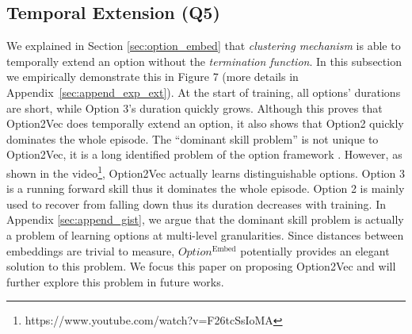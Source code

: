 \documentclass{article}
\newcommand{\linkblue}[1]{\textcolor[HTML]{2E649E}{#1}}
\begin{document}
\vspace{-3mm}\subsection{Temporal Extension (Q5)}
\label{sec:exp_ext}
\vspace{-2mm}We  explained in Section \ref{sec:option_embed} that
\emph{clustering mechanism} is able to temporally extend an
option without the \emph{termination function}. In this subsection we empirically demonstrate this in Figure \linkblue{7}
(more details in Appendix~\ref{sec:append_exp_ext}). 
At the start of training, all options' durations are short, while Option 3's
duration quickly grows. Although this proves that Option2Vec does
temporally extend an option, it also shows that Option2 quickly
dominates the whole episode. The ``dominant skill problem'' is
not unique to Option2Vec, it is a long identified problem of the
option framework \cite{haarnoja2018latent}. However, as shown in
the \linkblue{video}\footnote{\linkblue{https://www.youtube.com/watch?v=F26tcSsIoMA}},
Option2Vec actually learns distinguishable options. Option 3 is a
running forward skill thus it dominates the whole episode. Option
2 is mainly used to recover from falling down thus its duration
decreases with training. In Appendix \ref{sec:append_gist}, we
argue that the dominant skill problem is actually a problem of
learning options at multi-level granularities. Since distances
between embeddings are trivial to measure, $Option^{\textrm{Embed}}$
potentially provides an elegant solution to this problem. We
focus this paper on proposing Option2Vec and will further explore this problem in future works.
\end{document}
